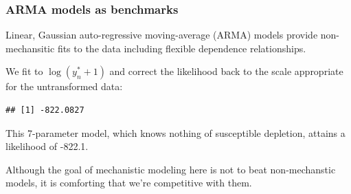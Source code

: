 \begin{frame}[fragile]
\frametitle{ARMA models as benchmarks}
\bi
\item Linear, Gaussian auto-regressive moving-average (ARMA) models provide non-mechansitic fits to the data including flexible dependence relationships.
\item We fit to $\log(y_n^*+1)$ and correct the likelihood back to the scale appropriate for the untransformed data:

\ei

\begin{knitrout}\small
{}\color{fgcolor}\begin{kframe}
\begin{alltt}
 \hlkwb{<-} \hlstd{(}\hlstd{(}\hlopt{+}\hlstd{)}
 \hlkwb{<-} \hlstd{=}\hlstd{(}\hlstd{,}\hlstd{,}\hlstd{),}
  \hlstd{=}\hlstd{(}\hlstd{=}\hlstd{(}\hlstd{,}\hlstd{,}\hlstd{),}\hlstd{=}\hlstd{))}
\hlopt{$}\hlopt{-}
\end{alltt}
\begin{verbatim}
## [1] -822.0827
\end{verbatim}
\end{kframe}
\end{knitrout}

\bi

\item This 7-parameter model, which knows nothing of susceptible depletion, attains a likelihood of -822.1.
\item Although the goal of mechanistic modeling here is not to beat non-mechanstic models, it is comforting that we're competitive with them.

\ei

\end{frame}

